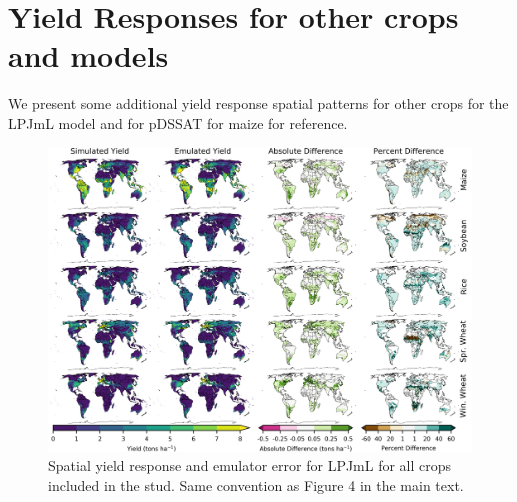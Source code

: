 \documentclass[12pt]{article}
\begin{document}

\clearpage
\section{Yield Responses for other crops and models}
\begin{flushleft}
We present some additional yield response spatial patterns for other crops for the LPJmL model and for pDSSAT for maize for reference. 
\end{flushleft}

\begin{figure}[h!]
  \includegraphics[width=\textwidth]{lpjml_grid.png}
  \caption{Spatial yield response and emulator error for LPJmL for all crops included in the stud. Same convention as Figure 4 in the main text.}
  \label{fig:lpjmlrice}
\end{figure}
\end{document}
